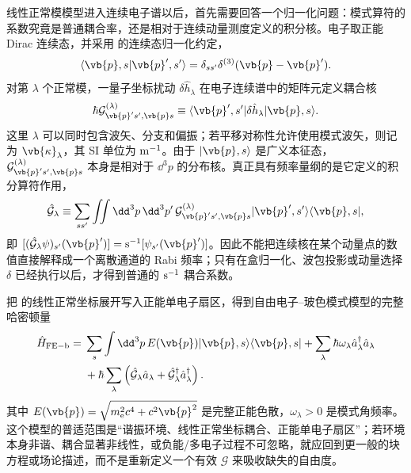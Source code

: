 线性正常模模型进入连续电子谱以后，首先需要回答一个归一化问题：模式算符的系数究竟是普通耦合率，还是相对于连续动量测度定义的积分核。电子取正能 Dirac 连续态，并采用 的连续态归一化约定，
\[
\langle\vb{p},s|\vb{p}',s'\rangle
=\delta_{ss'}\delta^{(3)}(\vb{p}-\vb{p}').
\]
对第 $\lambda$ 个正常模，一量子坐标扰动 $\delta\hat h_\lambda$ 在电子连续谱中的矩阵元定义耦合核
\begin{equation}
{
\hbar\mathcal G^{(\lambda)}_{\vb{p}'s',\vb{p}s}
\equiv
\langle\vb{p}',s'|\delta\hat h_\lambda|\vb{p},s\rangle.}
\label{eq:general_free_electron_mode_coupling_definition}
\end{equation}
这里 $\lambda$ 可以同时包含波矢、分支和偏振；若平移对称性允许使用模式波矢，则记为 $\vb{\kappa}_\lambda$，其 SI 单位为 ${\rm m^{-1}}$。由于 $|\vb{p},s\rangle$ 是广义本征态，$\mathcal G^{(\lambda)}_{\vb{p}'s',\vb{p}s}$ 本身是相对于 $\dd^3 p$ 的分布核。真正具有频率量纲的是它定义的积分算符作用，
\begin{equation}
{
\hat{\mathcal G}_\lambda
\equiv
\sum_{ss'}\iint\dd^3 p\,\dd^3 p'\,
\mathcal G^{(\lambda)}_{\vb{p}'s',\vb{p}s}
|\vb{p}',s'\rangle\langle\vb{p},s|,}
\label{eq:general_mode_coupling_operator}
\end{equation}
即 $[(\hat{\mathcal G}_\lambda\psi)_{s'}(\vb{p}')]={\rm s^{-1}}[\psi_{s'}(\vb{p}')]$。因此不能把连续核在某个动量点的数值直接解释成一个离散通道的 Rabi 频率；只有在盒归一化、波包投影或动量选择 $\delta$ 已经执行以后，才得到普通的 ${\rm s^{-1}}$ 耦合系数。

把 的线性正常坐标展开写入正能单电子扇区，得到自由电子--玻色模式模型的完整哈密顿量
\begin{equation}
{
\begin{aligned}
\hat H_{\rm FE-b}
={}&\sum_s\int\dd^3 p\,E(\vb{p})|\vb{p},s\rangle\langle\vb{p},s|
+\sum_\lambda\hbar\omega_\lambda \hat a_\lambda^\dagger\hat a_\lambda\\
&+\hbar\sum_\lambda
\left(\hat{\mathcal G}_\lambda\hat a_\lambda
+\hat{\mathcal G}_\lambda^\dagger\hat a_\lambda^\dagger\right).
\end{aligned}}
\label{eq:universal_free_electron_boson_hamiltonian}
\end{equation}
其中 $E(\vb{p})=\sqrt{m_{\mathrm e}^2c^4+c^2\vb{p}^2}$ 是完整正能色散，$\omega_\lambda>0$ 是模式角频率。这个模型的普适范围是“谐振环境、线性正常坐标耦合、正能单电子扇区”；若环境本身非谐、耦合显著非线性，或负能/多电子过程不可忽略，就应回到更一般的块方程或场论描述，而不是重新定义一个有效 $\mathcal G$ 来吸收缺失的自由度。

